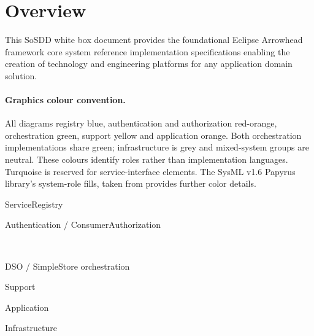 \documentclass[a4paper]{arrowhead}
\begin{document}
\newpage

\tableofcontents
\newpage

\section{Overview}
\label{sec:overview}

This SoSDD white box document provides the foundational Eclipse
Arrowhead framework core system reference implementation
specifications enabling the creation of technology and engineering platforms for any application domain solution.

\paragraph{Graphics colour convention.}
All diagrams registry blue, authentication
and authorization red-orange, orchestration green, support yellow and application
orange. Both orchestration implementations share 
green; infrastructure is grey and mixed-system groups are neutral. These colours
identify roles rather than implementation languages. Turquoise is
reserved for service-interface elements. The SysML v1.6 Papyrus
library's system-role fills, taken from  provides further
color details.
\begin{center}\scriptsize
\setlength{\fboxsep}{4pt}
\colorbox{AHSysMLRegistry}{\strut ServiceRegistry}\quad
\colorbox{AHSysMLSecurity}{\strut Authentication / ConsumerAuthorization}\\[6pt]
\colorbox{AHSysMLOrchestration}{\strut DSO / SimpleStore orchestration}\quad
\colorbox{AHSysMLSupport}{\strut Support}\quad
\colorbox{AHSysMLApplication}{\strut Application}\quad
\colorbox{AHSysMLInfrastructure}{\strut Infrastructure}
\end{center}

%

\end{document}
